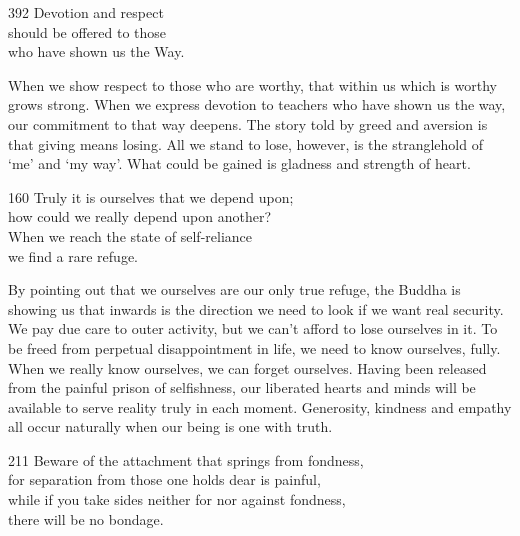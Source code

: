 
\begin{dhpVerse}{392}
\label{dhp-392}
Devotion and respect\\
should be offered to those\\
who have shown us the Way.
\end{dhpVerse}

\begin{dhpRefl}
When we show respect to those who are worthy, that within us which is worthy grows strong. When we express devotion to teachers who have shown us the way, our commitment to that way deepens. The story told by greed and aversion is that giving means losing. All we stand to lose, however, is the stranglehold of `me' and `my way'. What could be gained is gladness and strength of heart.
\end{dhpRefl}


\begin{dhpVerse}{160}
\label{dhp-160}
Truly it is ourselves that we depend upon;\\
how could we really depend upon another?\\
When we reach the state of self-reliance\\
we find a rare refuge.
\end{dhpVerse}

\begin{dhpRefl}
By pointing out that we ourselves are our only true refuge, the Buddha is showing us that inwards is the direction we need to look if we want real security. We pay due care to outer activity, but we can't afford to lose ourselves in it. To be freed from perpetual disappointment in life, we need to know ourselves, fully. When we really know ourselves, we can forget ourselves. Having been released from the painful prison of selfishness, our liberated hearts and minds will be available to serve reality truly in each moment. Generosity, kindness and empathy all occur naturally when our being is one with truth.
\end{dhpRefl}


\begin{dhpVerse}{211}
\label{dhp-211}
Beware of the attachment that springs from fondness,\\
for separation from those one holds dear is painful,\\
while if you take sides neither for nor against fondness,\\
there will be no bondage.
\end{dhpVerse}


